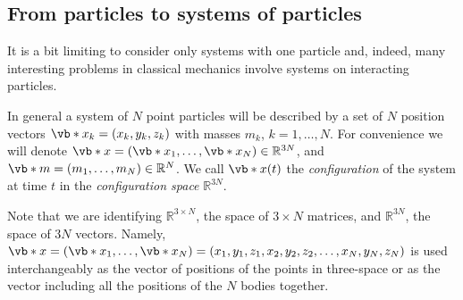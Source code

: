 \documentclass[english,fontsize=11pt,paper=b5]{scrbook}
\theoremstyle{definition}
\newcommand{\emphidx}[1]{\index{#1}\emph{#1}}
\begin{document}
  \subsection{From particles to systems of particles}

  It is a bit limiting to consider only systems with one particle and, indeed, many interesting problems in classical mechanics involve systems on interacting particles.

  In general a system of $N$ point particles  will be described by a set of $N$ position vectors $\vb*{x}_k = (x_k, y_k ,z_k)$ with masses $m_k$, $k = 1, \ldots, N$.
  For convenience we will denote $\vb*{x} = (\vb*{x}_1, \ldots, \vb*{x}_N)\in\mathbb{R}^{3N}$, and $\vb*{m} = (m_1, \ldots, m_N)\in\mathbb{R}^N$.
  We call $\vb*{x}(t)$ the \emphidx{configuration} of the system at time $t$ in the \emph{configuration space}  $\mathbb{R}^{3N}$.

  Note that we are identifying $\mathbb{R}^{3\times N}$, the space of $3\times N$ matrices, and $\mathbb{R}^{3N}$, the space of $3N$ vectors. Namely, $\vb*{x} = (\vb*{x}_1, \ldots, \vb*{x}_N) = (x_1, y_1, z_1, x_2, y_2, z_2, \ldots, x_N, y_N, z_N)$ is used interchangeably as the vector of positions of the points in three-space or as the vector including all the positions of the $N$ bodies together.
\end{document}
